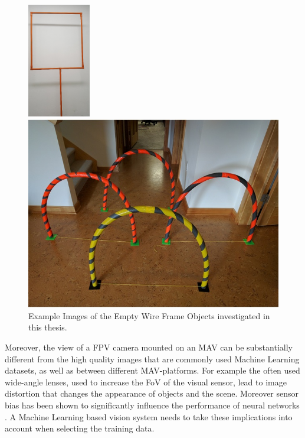\begin{figure}[bhtp]
	\centering
	\begin{minipage}{0.45\linewidth}
		\includegraphics[height=5cm]{fig/gate1}
	\end{minipage}\hfill
	\begin{minipage}{0.45\linewidth}
		\includegraphics[width=\textwidth]{fig/gate2}
	\end{minipage}
	\caption{Example Images of the Empty Wire Frame Objects investigated in this thesis. }
	\label{fig:gates}
\end{figure}

Moreover, the view of a \ac{FPV} camera mounted on an \ac{MAV} can be substantially different from the high quality images that are commonly used Machine Learning datasets, as well as between different \ac{MAV}-platforms. For example the often used wide-angle lenses, used to increase the \ac{FoV} of the visual sensor, lead to image distortion that changes the appearance of objects and the scene. Moreover sensor bias has been shown to significantly influence the performance of neural networks \cite{Andreopoulos2012,Dodge2016a}. A Machine Learning based vision system needs to take these implications into account when selecting the training data. 

